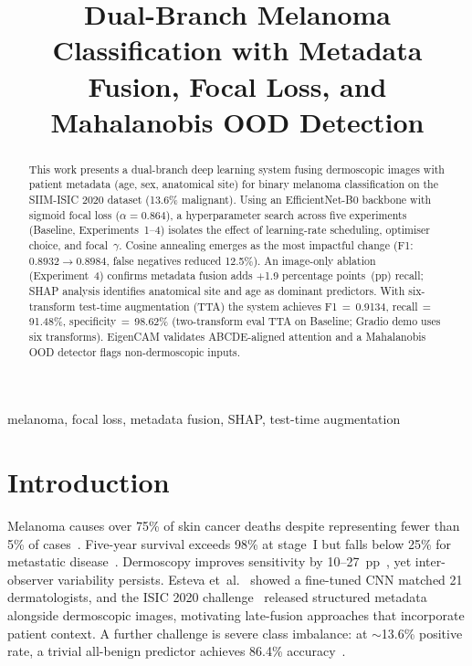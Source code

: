 \documentclass[conference]{IEEEtran}
\begin{document}
\title{Dual-Branch Melanoma Classification with Metadata Fusion, Focal Loss, and Mahalanobis OOD Detection}

\author{
}

\maketitle

\begin{abstract}
This work presents a dual-branch deep learning system fusing dermoscopic
images with patient metadata (age, sex, anatomical site) for binary melanoma
classification on the SIIM-ISIC 2020 dataset (13.6\% malignant). Using an
EfficientNet-B0 backbone with sigmoid focal loss ($\alpha{=}0.864$), a
hyperparameter search across five experiments (Baseline, Experiments~1--4)
isolates the effect of learning-rate scheduling, optimiser choice, and
focal~$\gamma$. Cosine annealing emerges as the most impactful change (F1:
$0.8932{\rightarrow}0.8984$, false negatives reduced 12.5\%). An image-only
ablation (Experiment~4) confirms metadata fusion adds $+$1.9 percentage
points~(pp) recall; SHAP analysis identifies anatomical site and age as
dominant predictors. With six-transform test-time augmentation (TTA) the
system achieves F1$\,{=}\,$0.9134, recall$\,{=}\,$91.48\%,
specificity$\,{=}\,$98.62\% (two-transform eval TTA on Baseline;
Gradio demo uses six transforms). EigenCAM validates ABCDE-aligned
attention and a Mahalanobis OOD detector flags non-dermoscopic inputs.
\end{abstract}

\begin{IEEEkeywords}
melanoma, focal loss, metadata fusion, SHAP, test-time augmentation
\end{IEEEkeywords}

\section{Introduction}

Melanoma causes over 75\% of skin cancer deaths despite representing fewer
than 5\% of cases~\cite{b1}. Five-year survival exceeds 98\% at stage~I but
falls below 25\% for metastatic disease~\cite{b2}. Dermoscopy improves
sensitivity by 10--27~pp~\cite{b3}, yet inter-observer variability persists.
Esteva et~al.~\cite{b4} showed a fine-tuned CNN matched 21 dermatologists,
and the ISIC 2020 challenge~\cite{b6} released structured metadata alongside
dermoscopic images, motivating late-fusion approaches that incorporate patient
context. A further challenge is severe class imbalance: at ${\sim}$13.6\%
positive rate, a trivial all-benign predictor achieves 86.4\%
accuracy~\cite{b11}.
\end{document}
